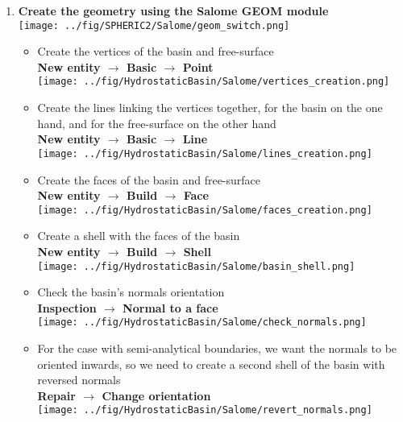 \documentclass{../GPUSPHtemplate}
\begin{document}
\begin{enumerate}
\item \textbf{Create the geometry using the Salome GEOM module}\smallskip\\
  \texttt{[image: ../fig/SPHERIC2/Salome/geom\_switch.png]}
  \begin{itemize}
  \item Create the vertices of the basin and free-surface\\
    \textbf{New entity $\to$ Basic $\to$ Point} \\
    \texttt{[image: ../fig/HydrostaticBasin/Salome/vertices\_creation.png]}
  \item Create the lines linking the vertices together, for the basin on the one hand, and for the free-surface on the other hand\\
    \textbf{New entity $\to$ Basic $\to$ Line}\\
    \texttt{[image: ../fig/HydrostaticBasin/Salome/lines\_creation.png]}
  \item Create the faces of the basin and free-surface\\
    \textbf{New entity $\to$ Build $\to$ Face}\\
    \texttt{[image: ../fig/HydrostaticBasin/Salome/faces\_creation.png]}
  \item Create a shell with the faces of the basin\\
    \textbf{New entity $\to$ Build $\to$ Shell}\\
    \texttt{[image: ../fig/HydrostaticBasin/Salome/basin\_shell.png]}
  \item Check the basin's normals orientation\\
    \textbf{Inspection $\to$ Normal to a face}\\
    \texttt{[image: ../fig/HydrostaticBasin/Salome/check\_normals.png]}
  \item For the case with semi-analytical boundaries, we want the normals to be oriented inwards, so we need to
    create a second shell of the basin with reversed normals\\
    \textbf{Repair $\to$ Change orientation}\\
    \texttt{[image: ../fig/HydrostaticBasin/Salome/revert\_normals.png]}

\end{itemize}
\end{enumerate}
\end{document}
